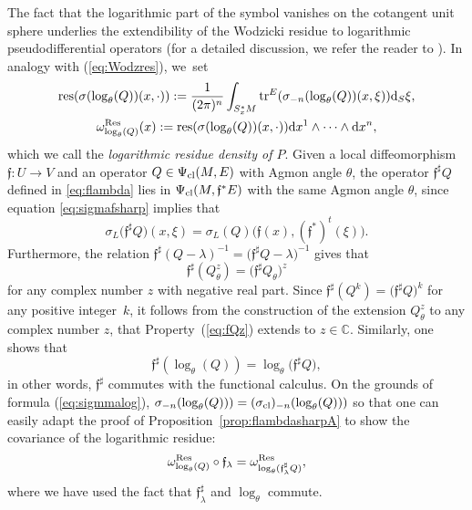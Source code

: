 \documentclass[10pt,a4paper]{amsart}
\numberwithin{equation}{section}
\theoremstyle{definition}
\newcommand{\C}{\mathbb C}
\begin{document}
The fact that the logarithmic part of the symbol vanishes on the cotangent unit sphere underlies the extendibility of the Wodzicki residue to logarithmic pseudodifferential operators (for a detailed discussion, we refer the reader to \cite[Section~2.7.1]{Sc}). In analogy with (\ref{eq:Wodzres}), we~set
\begin{gather}
{\rm res}(\sigma(\log_\theta (Q))(x,\cdot)) := \frac{1}{(2\pi)^n} \int_{S_x^*M}{\rm tr}^E(\sigma_{-n}(\log_\theta (Q)) (x, \xi)) {\rm d}_S\xi, \nonumber\\
\omega_{\log _\theta (Q)}^{\rm Res}(x) := {\rm res}(\sigma(\log_\theta (Q))(x,\cdot)) {\rm d}x^1\wedge \dots \wedge {\rm d}x^n,\label{eq:reslog}
\end{gather}
which we call the {\it logarithmic residue density of $P$}. Given a local diffeomorphism $\mathfrak{f}\colon U\to V$ and an operator $Q\in\Psi_{\rm cl}(M, E)$ with Agmon angle $\theta$, the operator $\mathfrak{f}^\sharp Q$ defined in \eqref{eq:flambda} lies in $\Psi_{\rm cl}(M, \mathfrak{f}^*E)$ with the same Agmon angle $\theta$, since equation \eqref{eq:sigmafsharp} implies that
\[
\sigma_L\bigl({\mathfrak{f}}^\sharp Q\bigr)(x, \xi)= \sigma_L(Q)\bigl(\mathfrak{f}(x), (\mathfrak{f}^*)^t (\xi)\bigr).
\]
Furthermore, the relation $\mathfrak{f}^\sharp(Q-\lambda)^{-1}=\bigl(\mathfrak{f}^\sharp Q-\lambda\bigr)^{-1}$ gives that
{\begin{equation}\label{eq:fQz}
\mathfrak{f}^\sharp(Q_\theta^z)= \bigl(\mathfrak{f}^\sharp Q_\theta\bigr)^z
\end{equation}
for any complex number $z$ with negative real part. Since $\mathfrak{f}^\sharp(Q^k)= \bigl(\mathfrak{f}^\sharp Q\bigr)^k$ for any positive integer~$k$, it follows from the construction of the extension $Q_\theta^z$ to any complex number $z$, that Property~(\ref{eq:fQz}) extends to $z\in \C$. Similarly, one shows that
\begin{equation*}
\mathfrak{f}^\sharp(\log _\theta (Q))=\log _\theta\bigl( \mathfrak{f}^\sharp Q\bigr),
\end{equation*}
in other words, $\mathfrak{f}^\sharp$ commutes with the functional calculus.} On the grounds of formula (\ref{eq:sigmmalog}), $\sigma_{-n}(\log _\theta (Q))) = (\sigma_{\rm cl})_{-n}(\log _\theta (Q)))$ so that one can easily adapt the proof of Proposition~\ref{prop:flambdasharpA} to show the covariance of the logarithmic residue:
\begin{equation}\label{eq:fReslog}
\omega_{\log_\theta (Q)}^{\rm Res}\circ{\mathfrak f}_\lambda =\omega^{\rm Res}_{ \log_\theta ({\mathfrak f}_\lambda^\sharp Q)},
\end{equation}
where we have used the fact that $\mathfrak{f}_\lambda^\sharp$ and $\log _\theta$ commute.
\end{document}
